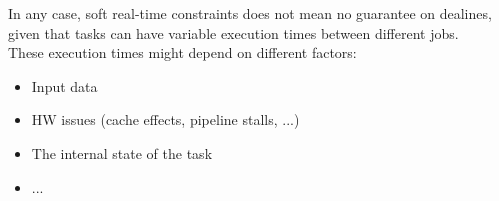 In any case, soft real-time constraints does not mean no guarantee on dealines, given that tasks can have variable execution times between different jobs.\\
These execution times might depend on different factors:
\begin{itemize}
\item Input data
\item HW issues (cache effects, pipeline stalls, ...)
\item The internal state of the task
\item ...
\end{itemize}





















